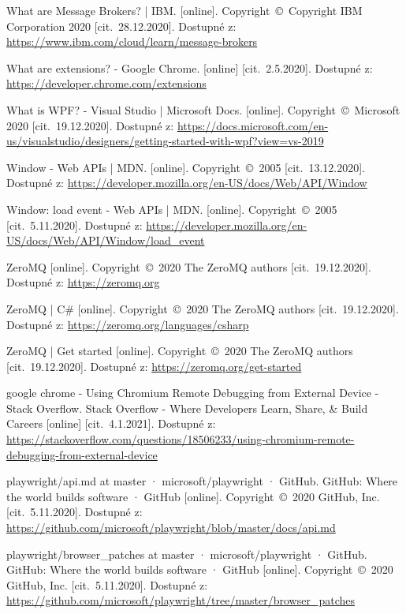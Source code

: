 \begin{thebibliography}{99}
 What are Message Brokers? | IBM. [online]. Copyright~©~Copyright IBM Corporation 2020 [cit.~28.12.2020]. Dostupné z: \url{https://www.ibm.com/cloud/learn/message-brokers}

 What are extensions? - Google Chrome. [online] [cit.~2.5.2020]. Dostupné z: \url{https://developer.chrome.com/extensions}

 What is WPF? - Visual Studio | Microsoft Docs. [online]. Copyright~©~Microsoft 2020 [cit.~19.12.2020]. Dostupné z: \url{https://docs.microsoft.com/en-us/visualstudio/designers/getting-started-with-wpf?view=vs-2019}

 Window - Web APIs | MDN. [online]. Copyright~©~2005 [cit.~13.12.2020]. Dostupné z: \url{https://developer.mozilla.org/en-US/docs/Web/API/Window}

 Window: load event - Web APIs | MDN. [online]. Copyright~©~2005 [cit.~5.11.2020]. Dostupné z: \url{https://developer.mozilla.org/en-US/docs/Web/API/Window/load_event}

 ZeroMQ [online]. Copyright~©~2020 The ZeroMQ authors [cit.~19.12.2020]. Dostupné z: \url{https://zeromq.org}

 ZeroMQ | C\# [online]. Copyright~©~2020 The ZeroMQ authors [cit.~19.12.2020]. Dostupné z: \url{https://zeromq.org/languages/csharp}

 ZeroMQ | Get started [online]. Copyright~©~2020 The ZeroMQ authors [cit.~19.12.2020]. Dostupné z: \url{https://zeromq.org/get-started}

 google chrome - Using Chromium Remote Debugging from External Device - Stack Overflow. Stack Overflow - Where Developers Learn, Share, \& Build Careers [online] [cit.~4.1.2021]. Dostupné z: \url{https://stackoverflow.com/questions/18506233/using-chromium-remote-debugging-from-external-device}

 playwright/api.md at master · microsoft/playwright · GitHub. GitHub: Where the world builds software · GitHub [online]. Copyright~©~2020 GitHub, Inc. [cit.~5.11.2020]. Dostupné z: \url{https://github.com/microsoft/playwright/blob/master/docs/api.md}

 playwright/browser\_patches at master · microsoft/playwright · GitHub. GitHub: Where the world builds software · GitHub [online]. Copyright~©~2020 GitHub, Inc. [cit.~5.11.2020]. Dostupné z: \url{https://github.com/microsoft/playwright/tree/master/browser_patches}


\end{thebibliography}
